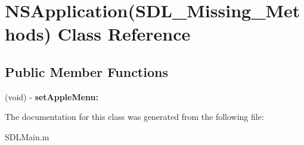 \hypertarget{interface_n_s_application_07_s_d_l___missing___methods_08}{
\section{NSApplication(SDL\_\-Missing\_\-Methods) Class Reference}
\label{interface_n_s_application_07_s_d_l___missing___methods_08}
}
\subsection*{Public Member Functions}
\begin{DoxyCompactItemize}
\item 
\hypertarget{interface_n_s_application_07_s_d_l___missing___methods_08_abc77a503ce35ae00353bc65f8d3f3f3e}{
(void) -\/ {\bfseries setAppleMenu:}}
\label{interface_n_s_application_07_s_d_l___missing___methods_08_abc77a503ce35ae00353bc65f8d3f3f3e}

\end{DoxyCompactItemize}


The documentation for this class was generated from the following file:\begin{DoxyCompactItemize}
\item 
SDLMain.m\end{DoxyCompactItemize}
